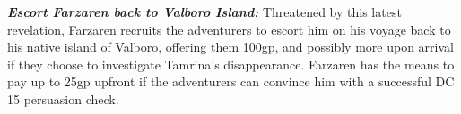 \begin{multicols*}{2}
	\textbf{\textit{Escort Farzaren back to Valboro Island:}} Threatened by this latest revelation, Farzaren recruits the adventurers to escort him on his voyage back to his native island of Valboro, offering them 100gp, and possibly more upon arrival if they choose to investigate Tamrina’s disappearance. Farzaren has the means to pay up to 25gp upfront if the adventurers can convince him with a successful DC 15 persuasion check.
	
\end{multicols*}
